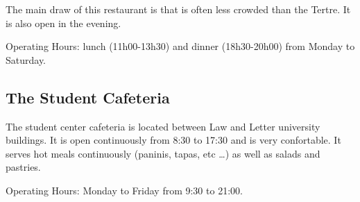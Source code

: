 

The main draw of this restaurant is that is often less crowded than the Tertre. It is also open in the evening.

Operating Hours: lunch (11h00-13h30) and dinner (18h30-20h00) from Monday to Saturday.


\subsection {The Student Cafeteria}


The student center cafeteria is located between Law and Letter university buildings.
It is open continuously from 8:30 to 17:30 and is very confortable.
It serves hot meals continuously (paninis, tapas, etc \dots) as well as salads and pastries.

Operating Hours: Monday to Friday from 9:30 to 21:00.



